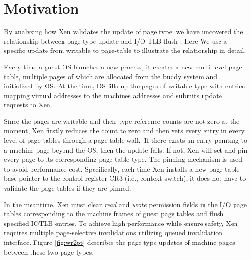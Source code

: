 \section{Motivation}



By analysing how Xen validates the update of page type, we have uncovered the relationship between page type update and I/O TLB flush . Here We use a specific update from writable to page-table to illustrate the relationship in detail.

Every time a guest OS launches a new process, it creates a new multi-level page table, multiple pages of which are allocated from the buddy system and initialized by OS. At the time, OS fills up the pages of writable-type with entries mapping virtual addresses to the machines addresses and submits update requests to Xen.

Since the pages are writable and their type reference counts are not zero at the moment, Xen firstly reduces the count to zero and then vets every entry in every level of page tables through a page table walk. If there exists an entry pointing to a machine page beyond the OS, then the update fails. If not, Xen will set and pin every page to its corresponding page-table type. The pinning mechanism is used to avoid performance cost. Specifically, each time Xen installs a new page table base pointer to the control register CR3 (i.e., context switch), it does not have to validate the page tables if they are pinned.

In the meantime, Xen must clear \emph{read} and \emph{write} permission fields in the I/O page tables corresponding to the machine frames of guest page tables and flush specified IOTLB entries. To achieve high performance while ensure safety, Xen requires multiple page-selective invalidations utilizing queued invalidation interface. Figure \ref{fig:wr2pt} describes the page type updates of machine pages between these two page types.

